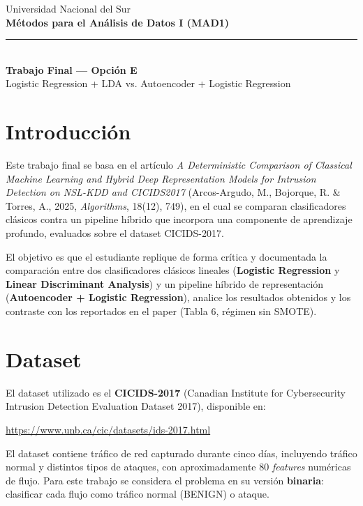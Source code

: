 \documentclass[11pt,a4paper]{article}
\begin{document}
\begin{center}
    {\color{azulUNS}\small Universidad Nacional del Sur}\\[2pt]
    {\color{azulUNS}\Large\bfseries M\'etodos para el An\'alisis de Datos I (MAD1)}\\[6pt]
    {\color{azulUNS}\rule{\textwidth}{1.2pt}}\\[8pt]
    {\Large\bfseries Trabajo Final --- Opci\'on E}\\[4pt]
    {\large Logistic Regression + LDA vs. Autoencoder + Logistic Regression}
\end{center}

\vspace{1em}

\section{Introducci\'on}
Este trabajo final se basa en el art\'iculo \textit{A Deterministic Comparison of Classical Machine Learning and Hybrid Deep Representation Models for Intrusion Detection on NSL-KDD and CICIDS2017} (Arcos-Argudo, M., Bojorque, R. \& Torres, A., 2025, \textit{Algorithms}, 18(12), 749), en el cual se comparan clasificadores cl\'asicos contra un pipeline h\'ibrido que incorpora una componente de aprendizaje profundo, evaluados sobre el dataset CICIDS-2017.

El objetivo es que el estudiante replique de forma cr\'itica y documentada la comparaci\'on entre dos clasificadores cl\'asicos lineales (\textbf{Logistic Regression} y \textbf{Linear Discriminant Analysis}) y un pipeline h\'ibrido de representaci\'on (\textbf{Autoencoder + Logistic Regression}), analice los resultados obtenidos y los contraste con los reportados en el paper (Tabla 6, r\'egimen sin SMOTE).

\section{Dataset}
El dataset utilizado es el \textbf{CICIDS-2017} (Canadian Institute for Cybersecurity Intrusion Detection Evaluation Dataset 2017), disponible en:
\begin{center}
\url{https://www.unb.ca/cic/datasets/ids-2017.html}
\end{center}
El dataset contiene tr\'afico de red capturado durante cinco d\'ias, incluyendo tr\'afico normal y distintos tipos de ataques, con aproximadamente 80 \textit{features} num\'ericas de flujo. Para este trabajo se considera el problema en su versi\'on \textbf{binaria}: clasificar cada flujo como tr\'afico normal (BENIGN) o ataque.
\end{document}
